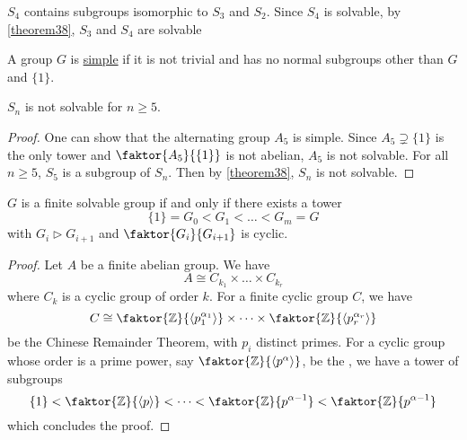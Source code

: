 \documentclass[11pt]{article}
\newcommand{\cyclic}[1]{\left\langle #1 \right\rangle}
\newcommand{\quotient}[2]{\faktor{#1}{#2}}
\begin{document}
\begin{example}
$S_4$ contains subgroups isomorphic to $S_3$ and $S_2$. Since $S_4$ is solvable,
by \cref{theorem38}, $S_3$ and $S_4$ are solvable
\end{example}
\begin{definition}
A group $G$ is \underline{simple} if it is not trivial and has no normal
subgroups other than $G$ and $\{1\}$.
\end{definition}
\begin{remark}
$S_n$ is not solvable for $n \geq 5$.
\end{remark}
\begin{proof}
One can show that the alternating group $A_5$ is simple. Since $A_5 \supsetneq
\{1\}$ is the only tower and $\quotient{A_5}{\{1\}}$ is not abelian, $A_5$
is not solvable. For all $n \geq 5$, $S_5$ is a subgroup of $S_n$. Then by
\cref{theorem38}, $S_n$ is not solvable.
\end{proof}
\begin{corollary}
$G$ is a finite solvable group if and only if there exists a tower
\begin{equation*}
\{1\} = G_0 < G_1 < \dots < G_m = G
\end{equation*}
with $G_{i} \triangleright G_{i+1}$ and $\quotient{G_i}{G_{i+1}}$ is cyclic.
\label{corollary39}
\end{corollary}
\begin{proof}
Let $A$ be a finite abelian group. We have
\begin{equation*}
A \cong C_{k_1} \times \dots \times C_{k_r} 
\end{equation*}
where $C_k$ is a cyclic group of order $k$. For a finite cyclic group $C$, we
have
\begin{equation*}
C \cong \quotient{\Z}{\cyclic{p_1^{\alpha_1}}} \times \dots \times
\quotient{\Z}{\cyclic{p_r^{\alpha_r}}}
\end{equation*}
be the Chinese Remainder Theorem, with $p_i$ distinct primes. For a cyclic group
whose order is a prime power, say $\quotient{\Z}{\cyclic{p^\alpha}}$, be the
, we have a tower of subgroups
\begin{equation*}
\{1\} < \quotient{\Z}{\cyclic{p}} < \dots < \quotient{\Z}{p^{\alpha-1}} <
\quotient{\Z}{p^{\alpha-1}}
\end{equation*}
which concludes the proof.
\end{proof}

\pagebreak
\end{document}
